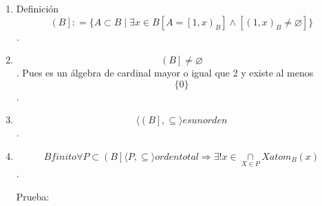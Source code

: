 \documentclass[
]{article}
\begin{document}
\begin{enumerate}
\begin{enumerate}
\begin{enumerate}
\begin{enumerate}
        Hace lo que tiene que hacer un complementario.
      \item
        \[\forall{z \in \left\lbrack {x,0} \right\rbrack_{B}}{{{{{z'} + z} = {{x \cdot \overline{z}} + z}} = {x + z}} = x}\]
      \item
        \[\forall{z \in \left\lbrack {x,0} \right\rbrack_{B}}{{{{z'} \cdot z} = {{x \cdot \overline{z}} \cdot z}} = 0}\]

        Aplicamos la existencia de elementos átomos y que \[x\] no lo
        es.
      \item
        \[\mathsf{\mathit{atom}}_{B}{(x)}\Rightarrow{\left( {x,0} \right)_{B} \neq \varnothing}\]
      \item
        \[\exists{y \in \mathit{Atom}}{(\left\lbrack {x,0} \right\rbrack_{B})}\]
      \item
        \[y < x\]
      \end{enumerate}
    \item
      Definición
      \emph{\[\left( B \right\rbrack{: = {\{{{A \subset B} \mid \exists{x \in B}{\left\lbrack {A = \left\lbrack {1,x} \right)_{B}} \right\rbrack \land \left\lbrack {\left( {1,x} \right)_{B} \neq \varnothing} \right\rbrack}}\}}}\]}.
    \item
      \emph{\[\left( B \right\rbrack \neq \varnothing\]}. Pues es un
      álgebra de cardinal mayor o igual que 2 y existe al menos
      \[\{ 0\}\].
    \item
      \emph{\[{\langle{\left( B \right\rbrack, \subseteq}\rangle}\mathit{es}\mathit{un}\mathit{orden}\]}.
    \item
      \emph{\[B\mathit{finito}\forall{P \subset \left( B \right\rbrack}{\langle{P, \subseteq}\rangle}\mathit{orden}\mathit{total}\Rightarrow\exists!{x \in \underset{X \in P}{\cap}}X\mathsf{\mathit{atom}}_{B}{(x)}\]}.

      Prueba:


\end{enumerate}
\end{enumerate}
\end{enumerate}
\end{document}
